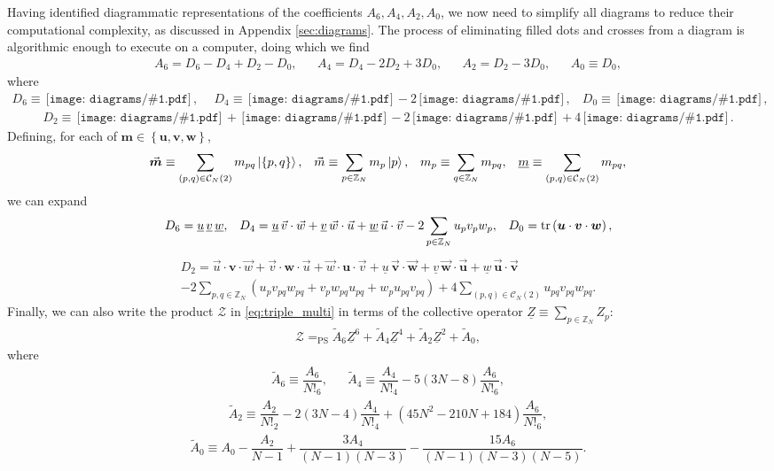 \documentclass[nofootinbib,notitlepage,11pt]{revtex4-2}
\newcommand{\f}[2]{\dfrac{#1}{#2}} %
\newcommand{\p}[1]{\left(#1\right)} %
\renewcommand{\set}[1]{\left\{#1\right\}} %
\renewcommand{\c}{\cdot} %
\newcommand{\m}{\bm} %
\renewcommand{\v}{\vec} %
\newcommand{\1}{\mathds{1}}
\newcommand{\C}{\mathcal{C}}
\newcommand{\Z}{\mathcal{Z}}
\newcommand{\ZZ}{\mathbb{Z}}
\newcommand{\EQPS}{=_{\text{PS}}}
\newcommand{\col}{\underline}
\newcommand{\diagram}[1]
{\,\texttt{[image: diagrams/\#1.pdf]}\,}
\begin{document}
Having identified diagrammatic representations of the coefficients
$A_6,A_4,A_2,A_0$, we now need to simplify all diagrams to reduce
their computational complexity, as discussed in Appendix
\ref{sec:diagrams}.  The process of eliminating filled dots and
crosses from a diagram is algorithmic enough to execute on a computer,
doing which we find
\begin{align}
  A_6 = D_6 - D_4 + D_2 - D_0,
  &&
  A_4 = D_4 - 2 D_2 + 3 D_0,
  &&
  A_2 = D_2 - 3 D_0,
  &&
  A_0 \equiv D_0,
\end{align}
where
\begin{align}
  D_6 \equiv \diagram{triple_0_o},
  &&
  D_4 \equiv \diagram{triple_01_o} - 2 \diagram{triple_1_o},
  &&
  D_0 \equiv \diagram{triple_0111_o},
\end{align}
\begin{align}
  D_2 \equiv \diagram{triple_011_o}
  + \diagram{triple_02_o}
  - 2 \diagram{triple_11_o}
  + 4 \diagram{triple_2_o}.
\end{align}
Defining, for each of $\m m\in\set{\m u,\m v,\m w}$,
\begin{align}
  \v{\m m} \equiv \sum_{\p{p,q}\in\C_N\p{2}} m_{pq} \ket{\set{p,q}},
  &&
  \v m \equiv \sum_{p\in\ZZ_N} m_p \ket{p},
  &&
  m_p \equiv \sum_{q\in\ZZ_N} m_{pq},
  &&
  \col{m} \equiv \sum_{\p{p,q}\in\C_N\p{2}} m_{pq},
\end{align}
we can expand
\begin{align}
  D_6 = \col{u}\,\col{v}\,\col{w},
  &&
  D_4 = \col{u}\,\v v\c\v w + \col{v}\,\v w\c\v u
  + \col{w}\,\v u\c\v v - 2 \sum_{p\in\ZZ_N} u_p v_p w_p,
  &&
  D_0 = \tr\p{\m u \c \m v \c \m w},
\end{align}
\begin{multline}
  D_2 = \v u \c\m v\c\v w + \v v \c\m w\c\v u + \v w \c\m u\c\v v
  + \col{u}\,\v{\m v}\c\v{\m w} + \col{v}\,\v{\m w}\c\v{\m u}
  + \col{w}\,\v{\m u}\c\v{\m v} \\
  - 2 \sum_{p,q\in\ZZ_N} \p{u_p v_{pq} w_{pq}
    + v_p w_{pq} u_{pq} + w_p u_{pq} v_{pq}}
  + 4 \sum_{\p{p,q}\in\C_N\p{2}} u_{pq} v_{pq} w_{pq}.
\end{multline}
Finally, we can also write the product $\Z$ in \eqref{eq:triple_multi}
in terms of the collective operator
$\col{Z} \equiv \sum_{p\in\ZZ_N} Z_p$:
\begin{align}
  \Z \EQPS
  \tilde A_6 \col{Z}^6 + \tilde A_4 \col{Z}^4
  + \tilde A_2 \col{Z}^2 + \tilde A_0,
  \label{eq:triple_col}
\end{align}
where
\begin{align}
  \tilde A_6 \equiv \f{A_6}{N!_6},
  &&
  \tilde A_4 \equiv \f{A_4}{N!_4} - 5\p{3N-8} \f{A_6}{N!_6},
\end{align}
\begin{align}
  \tilde A_2 \equiv \f{A_2}{N!_2} - 2\p{3N-4} \f{A_4}{N!_4}
  + \p{45N^2-210N+184} \f{A_6}{N!_6},
\end{align}
\begin{align}
  \tilde A_0 \equiv A_0 - \f{A_2}{N-1}
  + \f{3A_4}{\p{N-1}\p{N-3}}
  - \f{15A_6}{\p{N-1}\p{N-3}\p{N-5}}.
\end{align}


\end{document}
